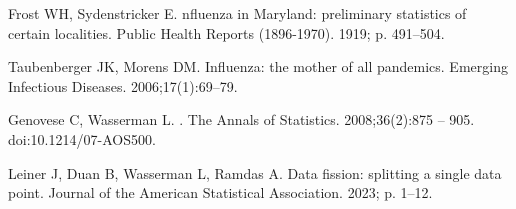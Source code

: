 \documentclass[10pt,letterpaper]{article}
\begin{document}
\begin{thebibliography}{10}
  Frost WH, Sydenstricker E.
  nfluenza in {M}aryland: preliminary statistics of certain
    localities.
  \newblock Public Health Reports (1896-1970). 1919; p. 491--504.
  
  Taubenberger JK, Morens DM.
   {I}nfluenza: the mother of all pandemics.
  \newblock Emerging Infectious Diseases. 2006;17(1):69--79.
  
  Genovese C, Wasserman L.
  .
  \newblock The Annals of Statistics. 2008;36(2):875 -- 905.
  \newblock doi:{10.1214/07-AOS500}.
  
  Leiner J, Duan B, Wasserman L, Ramdas A.
  \newblock Data fission: splitting a single data point.
  \newblock Journal of the American Statistical Association. 2023; p. 1--12.
  
\end{thebibliography}

 
\end{document}
